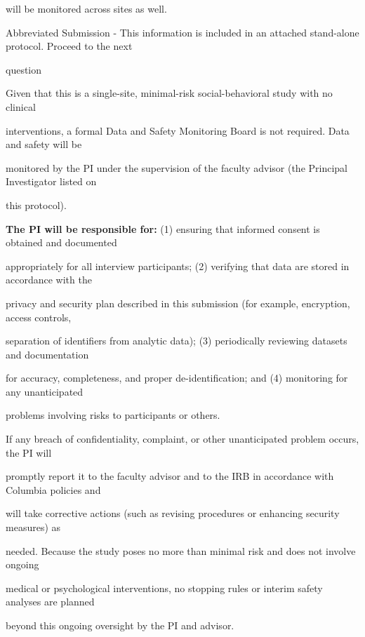 \documentclass[10pt, letterpaper]{article}
\begin{document}
will be monitored across sites as well.

\noindent \makebox[0pt][l]{$\square$}\hspace{1.2em} Abbreviated Submission - This information is included in an attached stand-alone protocol. Proceed to the next

\begin{responsebox}

question

Given that this is a single-site, minimal-risk social-behavioral study with no clinical

\end{responsebox}

interventions, a formal Data and Safety Monitoring Board is not required. Data and safety will be

monitored by the PI under the supervision of the faculty advisor (the Principal Investigator listed on

this protocol).

\noindent \textbf{The PI will be responsible for:} (1) ensuring that informed consent is obtained and documented

appropriately for all interview participants; (2) verifying that data are stored in accordance with the

privacy and security plan described in this submission (for example, encryption, access controls,

separation of identifiers from analytic data); (3) periodically reviewing datasets and documentation

for accuracy, completeness, and proper de-identification; and (4) monitoring for any unanticipated

problems involving risks to participants or others.

If any breach of confidentiality, complaint, or other unanticipated problem occurs, the PI will

promptly report it to the faculty advisor and to the IRB in accordance with Columbia policies and

will take corrective actions (such as revising procedures or enhancing security measures) as

needed. Because the study poses no more than minimal risk and does not involve ongoing

medical or psychological interventions, no stopping rules or interim safety analyses are planned

beyond this ongoing oversight by the PI and advisor.
\end{document}
